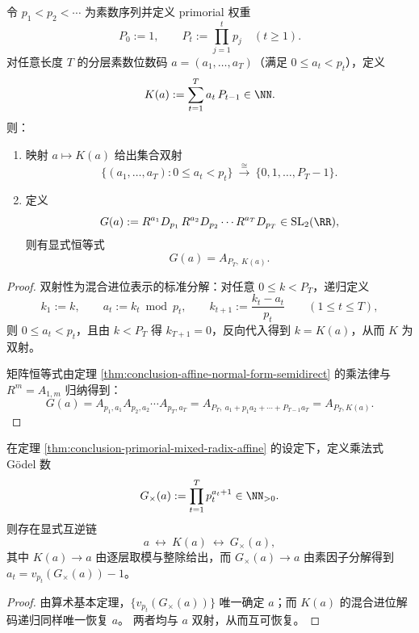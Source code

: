 \begin{theorem}\label{thm:conclusion-primorial-mixed-radix-affine}
令 \(p_1<p_2<\cdots\) 为素数序列并定义 primorial 权重
\[
P_0:=1,\qquad P_t:=\prod_{j=1}^{t}p_j\quad(t\ge 1).
\]
对任意长度 \(T\) 的分层素数位数码 \(a=(a_1,\dots,a_T)\)（满足 \(0\le a_t<p_t\)），定义
\[
K(a):=\sum_{t=1}^{T}a_t\,P_{t-1}\in\NN.
\]
则：
\begin{enumerate}
  \item 映射 \(a\mapsto K(a)\) 给出集合双射
  \[
  \{(a_1,\dots,a_T):0\le a_t<p_t\}\ \xrightarrow{\ \cong\ }\ \{0,1,\dots,P_T-1\}.
  \]
  \item 定义
  \[
  G(a):=R^{a_1}D_{p_1}\,R^{a_2}D_{p_2}\cdots R^{a_T}D_{p_T}\in \mathrm{SL}_2(\RR),
  \]
  则有显式恒等式
\[
  G(a)=A_{P_T,\ K(a)}.
  \]
\end{enumerate}
\end{theorem}
\begin{proof}
双射性为混合进位表示的标准分解：对任意 \(0\le k<P_T\)，递归定义
\[
k_1:=k,\qquad a_t:=k_t\bmod p_t,\qquad k_{t+1}:=\frac{k_t-a_t}{p_t}\qquad(1\le t\le T),
\]
则 \(0\le a_t<p_t\)，且由 \(k<P_T\) 得 \(k_{T+1}=0\)，反向代入得到 \(k=K(a)\)，从而 \(K\) 为双射。
\par
矩阵恒等式由定理 \ref{thm:conclusion-affine-normal-form-semidirect} 的乘法律与 \(R^{m}=A_{1,m}\) 归纳得到：
\[
G(a)
=A_{p_1,a_1}A_{p_2,a_2}\cdots A_{p_T,a_T}
=A_{P_T,\ a_1+p_1a_2+\cdots+P_{T-1}a_T}
=A_{P_T,K(a)}.
\]
\end{proof}

\begin{corollary}\label{cor:conclusion-primorial-additive-vs-godel-multiplicative}
在定理 \ref{thm:conclusion-primorial-mixed-radix-affine} 的设定下，定义乘法式 Gödel 数
\[
G_{\times}(a):=\prod_{t=1}^{T}p_t^{a_t+1}\in\NN_{>0}.
\]
则存在显式互逆链
\[
a\ \longleftrightarrow\ K(a)\ \longleftrightarrow\ G_{\times}(a),
\]
其中 \(K(a)\to a\) 由逐层取模与整除给出，而 \(G_{\times}(a)\to a\) 由素因子分解得到 \(a_t=v_{p_t}(G_{\times}(a))-1\)。
\end{corollary}
\begin{proof}
由算术基本定理，\(\{v_{p_t}(G_{\times}(a))\}\) 唯一确定 \(a\)；而 \(K(a)\) 的混合进位解码递归同样唯一恢复 \(a\)。
两者均与 \(a\) 双射，从而互可恢复。
\end{proof}

